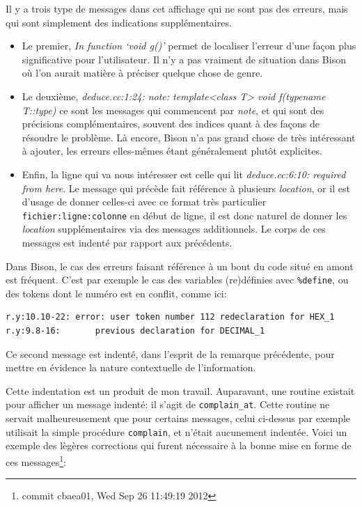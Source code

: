 \documentclass[a4paper,11pt,twoside,final]{article}
\begin{document}
  Il y a trois type de messages dans cet affichage qui ne sont pas des erreurs,
  mais qui sont simplement des indications supplémentaires.

  \begin{itemize}
    \item Le premier, \og \textit{In function `void g()'} \fg permet de
      localiser l'erreur d'une façon plus significative pour l'utilisateur. Il
      n'y a pas vraiment de situation dans Bison où l'on aurait matière à
      préciser quelque chose de genre.
    \item Le deuxième, \og \textit{deduce.cc:1:24: note: template<class T> void
      f(typename T::type)} \fg ce sont les messages qui commencent par
      \textit{note}, et qui sont des précisions complémentaires, souvent des
      indices quant à des façons de résoudre le problème. Là encore, Bison n'a
      pas grand chose de très intéressant à ajouter, les erreurs elles-mêmes
      étant généralement plutôt explicites.
    \item Enfin, la ligne qui va nous intéresser est celle qui lit \og
      \textit{deduce.cc:6:10:   required from here}\fg. Le message qui précède
      fait référence à plusieurs \textit{location}, or il est d'usage de donner
      celles-ci avec ce format très particulier \texttt{fichier:ligne:colonne}
      en début de ligne, il est donc naturel de donner les \textit{location}
      supplémentaires via des messages additionnels. Le corps de ces messages
      est indenté par rapport aux précédents.
  \end{itemize}

  Dans Bison, le cas des erreurs faisant référence à un bout du code situé en
  amont est fréquent. C'est par exemple le cas des variables (re)définies avec
  \texttt{\%define}, ou des tokens dont le numéro est en conflit, comme ici:

  \begin{verbatim}
r.y:10.10-22: error: user token number 112 redeclaration for HEX_1
r.y:9.8-16:       previous declaration for DECIMAL_1
  \end{verbatim}

  Ce second message est indenté, dans l'esprit de la remarque précédente, pour
  mettre en évidence la nature contextuelle de l'information.

  Cette indentation est un produit de mon travail. Auparavant, une routine
  existait pour afficher un message indenté: il s'agit de
  \texttt{complain\_at}.  Cette routine ne servait malheureusement que pour
  certains messages, celui ci-dessus par exemple utilisait la simple procédure
  \texttt{complain}, et n'était aucunement indentée. Voici un exemple des
  lègères corrections qui furent nécessaire à la bonne mise en forme de ces
  messages\footnote{commit cbaea01, Wed Sep 26 11:49:19 2012}:
\end{document}

